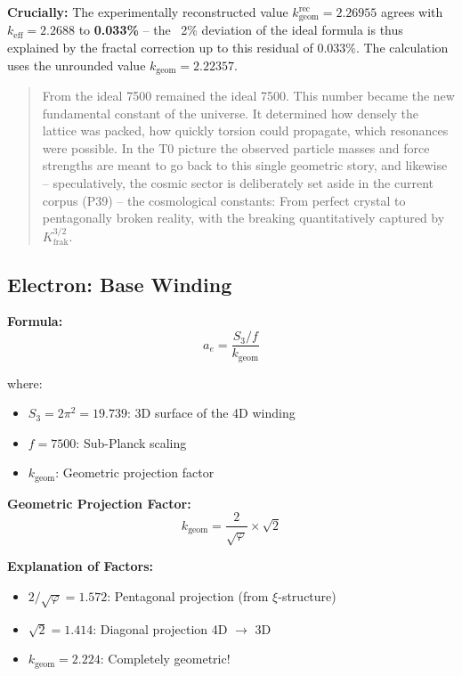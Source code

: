 	\textbf{Crucially:} The experimentally reconstructed value \(k_\text{geom}^\text{rec} = 2.26955\) agrees with $k_\text{eff} = 2.2688$ to \textbf{0.033\%} -- the ~2\% deviation of the ideal formula is thus explained by the fractal correction up to this residual of 0.033\%. The calculation uses the unrounded value $k_\text{geom} = 2.22357$.
	\begin{quotation}
		From the ideal 7500 remained the ideal 7500. This number became the new fundamental constant of the universe. It determined how densely the lattice was packed, how quickly torsion could propagate, which resonances were possible.
		In the T0 picture the observed particle masses and force strengths are meant to go back to this single geometric story, and likewise -- speculatively, the cosmic sector is deliberately set aside in the current corpus (P39) -- the cosmological constants: From perfect crystal to pentagonally broken reality, with the breaking quantitatively captured by $K_\text{frak}^{3/2}$.
	\end{quotation}
	
	\subsection{Electron: Base Winding}
	
	\textbf{Formula:}
	\begin{equation}
		a_e = \frac{S_3/f}{k_{\text{geom}}}
		\label{eq:ae}
	\end{equation}
	
	where:
	\begin{itemize}
		\item $S_3 = 2\pi^2 = 19.739$: 3D surface of the 4D winding
		\item $f = 7500$: Sub-Planck scaling
		\item $k_{\text{geom}}$: Geometric projection factor
	\end{itemize}
	
	\textbf{Geometric Projection Factor:}
	\begin{equation}
		k_{\text{geom}} = \frac{2}{\sqrt{\varphi}} \times \sqrt{2}
		\label{eq:kgeom}
	\end{equation}
	
	\textbf{Explanation of Factors:}
	\begin{itemize}
		\item $2/\sqrt{\varphi} = 1.572$: Pentagonal projection (from $\xi$-structure)
		\item $\sqrt{2} = 1.414$: Diagonal projection 4D $\to$ 3D
		\item $k_{\text{geom}} = 2.224$: Completely geometric!
	\end{itemize}
	
